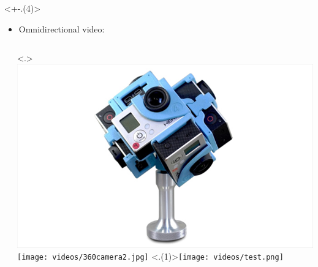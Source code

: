 \begin{frame}[c]
\begin{columns}[T]
\begin{column}{0.35\linewidth}
         \vspace{-0.25cm}
         {}%
     \end{column}
   \end{columns}

   \vfill
   \begin{minipage}[t][4cm][t]{\textwidth}
      \only<+-.(4)>{
         \begin{itemize}[<.->]
            \item Omnidirectional video:
         \end{itemize}
         \begin{columns}[T]
            \begin{column}{0.5\linewidth}
               \begin{independentCounter}
                  
               \end{independentCounter}
            \end{column}
            \begin{column}{0.5\linewidth}
               \only<.>{
                  \includegraphics[scale=0.15]{videos/360camera1.png}
                  \texttt{[image: videos/360camera2.jpg]}
                  \setcounter{tmpCounter}{\value{beamerpauses}}
               }
               \only<.(1)>{\hspace{2cm}\texttt{[image: videos/test.png]}}

\end{column}
\end{columns}}
\end{minipage}
\end{frame}
